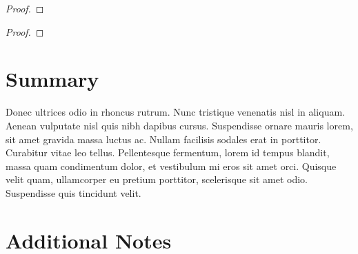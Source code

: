 \documentclass[
10pt, %
a4paper, %
twocolumn, %
landscape %
]{article}
\begin{document}
\vspace{5pt}

\begin{proof}

\end{proof}

\vspace{5pt}

\begin{thm}

\end{thm}

\vspace{5pt}

\begin{proof}

\end{proof}

\vspace{7pt}



\section{Summary}

Donec ultrices odio in rhoncus rutrum. Nunc tristique venenatis nisl in aliquam. Aenean vulputate nisl quis nibh dapibus cursus. Suspendisse ornare mauris lorem, sit amet gravida massa luctus ac. Nullam facilisis sodales erat in porttitor. Curabitur vitae leo tellus. Pellentesque fermentum, lorem id tempus blandit, massa quam condimentum dolor, et vestibulum mi eros sit amet orci. Quisque velit quam, ullamcorper eu pretium porttitor, scelerisque sit amet odio. Suspendisse quis tincidunt velit. 


\section{Additional Notes}

\begin{nt}

\end{nt}

\vspace{5pt}

\begin{nt}

\end{nt}

\vspace{7pt}


\renewcommand{\refname}{Reference} %


\end{document}
